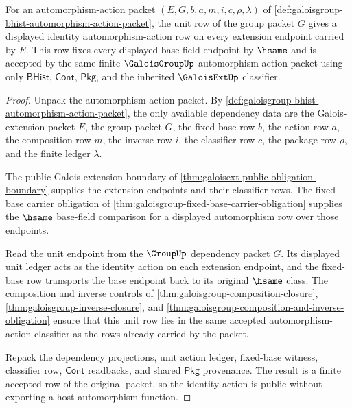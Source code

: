 \begin{theorem}
\label{thm:galoisgroup-identity-action-row}
For an automorphism-action packet $(E,G,b,a,m,i,c,\rho,\lambda)$ of
\autoref{def:galoisgroup-bhist-automorphism-action-packet}, the unit row of the
group packet $G$ gives a displayed identity automorphism-action row on every
extension endpoint carried by $E$. This row fixes every displayed base-field
endpoint by $\hsame$ and is accepted by the same finite
$\GaloisGroupUp$ automorphism-action packet using only $\mathsf{BHist}$,
$\mathsf{Cont}$, $\mathsf{Pkg}$, and the inherited
$\GaloisExtUp$ classifier.
\end{theorem}
\begin{proof}
Unpack the automorphism-action packet. By
\autoref{def:galoisgroup-bhist-automorphism-action-packet}, the only available
dependency data are the Galois-extension packet $E$, the group packet $G$, the
fixed-base row $b$, the action row $a$, the composition row $m$, the inverse row
$i$, the classifier row $c$, the package row $\rho$, and the finite ledger
$\lambda$.

The public Galois-extension boundary of
\autoref{thm:galoisext-public-obligation-boundary} supplies the extension
endpoints and their classifier rows. The fixed-base carrier obligation of
\autoref{thm:galoisgroup-fixed-base-carrier-obligation} supplies the
$\hsame$ base-field comparison for a displayed automorphism row over those
endpoints.

Read the unit endpoint from the $\GroupUp$ dependency packet $G$. Its displayed
unit ledger acts as the identity action on each extension endpoint, and the
fixed-base row transports the base endpoint back to its original $\hsame$ class.
The composition and inverse controls of
\autoref{thm:galoisgroup-composition-closure},
\autoref{thm:galoisgroup-inverse-closure}, and
\autoref{thm:galoisgroup-composition-and-inverse-obligation} ensure that this
unit row lies in the same accepted automorphism-action classifier as the rows
already carried by the packet.

Repack the dependency projections, unit action ledger, fixed-base witness,
classifier row, $\mathsf{Cont}$ readbacks, and shared $\mathsf{Pkg}$
provenance. The result is a finite accepted row of the original packet, so the
identity action is public without exporting a host automorphism function.
\end{proof}

